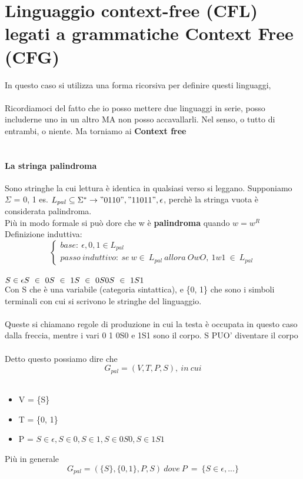 \documentclass[12pt, a4paper, openany, oneside]{book}
\begin{document}
\section{Linguaggio context-free (CFL) legati a grammatiche Context Free (CFG)}
In questo caso si utilizza una forma ricorsiva per definire questi linguaggi,
\\ \\
Ricordiamoci del fatto che io posso mettere due linguaggi in serie, posso 
includerne uno in un altro MA non posso accavallarli. Nel senso, o tutto di 
entrambi, o niente. Ma torniamo ai \textbf{Context free}
\\ \\
\paragraph{La stringa palindroma}
Sono stringhe la cui lettura è identica in qualsiasi verso si leggano. Supponiamo
$\Sigma$ = {0, 1} es. $L_{pal} \subseteq \Sigma ^{*} \to "0110", "11011", 
\epsilon$, perchè la stringa vuota è considerata palindroma. \\ 
Più in modo formale si può dore che w è \textbf{palindroma} quando $w = w^{R}$
Definizione induttiva:
$$
\begin{cases}
base:~\epsilon, 0, 1 \in L_{pal} \\
passo~induttivo:~ se ~w\in ~L_{pal} ~allora ~OwO, ~1w1 ~\in ~L_{pal}
\end{cases}
$$
\\
$
S \in \epsilon\\
S ~ \in ~ 0 \\
S ~ \in ~ 1 \\
S ~ \in ~ 0S0 \\
S ~ \in ~ 1S1$ \\
Con S che è una variabile (categoria sintattica), e \{0, 1\} che sono i simboli
terminali con cui si scrivono le stringhe del linguaggio.\\ \\
Queste si chiamano regole di produzione in cui la testa è occupata in questo
caso dalla freccia, mentre i vari 0 1 0S0 e 1S1 sono il corpo. S PUO' diventare
il corpo \\ \\ 
Detto questo possiamo dire che
$$G_{pal} = (V, T, P, S), ~in ~cui $$\\
\begin{itemize}
	\item V = \{S\}
	\item T = \{0, 1\}
	\item P = $S \in \epsilon, S \in 0, S \in 1, S \in 0S0, S \in 1S1$
\end{itemize}
Più in generale
$$G_{pal} = (\{S\},\{0, 1\}, P, S) ~  dove ~  P  ~ = ~  \{S \in \epsilon, ...\}$$
\end{document}
